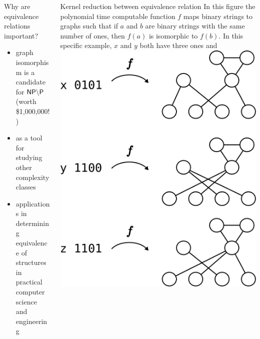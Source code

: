 \documentclass[final]{beamer}
\begin{document}
\begin{frame}{}
\begin{columns}[t]
\begin{column}{.3\linewidth}
      \begin{block}{\LARGE Why are equivalence relations important?}
        \begin{itemize}
          \Large
        \item graph isomorphism is a candidate for ${\mathsf{NP}}\backslash{\ensuremath{\mathsf{P}}}$ (worth
          \$1,000,000!)
        \item as a tool for studying other complexity classes
        \item applications in determining equivalence of structures in
          practical computer science and engineering
        \end{itemize}
      \end{block}
    \end{column}

    \begin{column}{.3\linewidth}
      \begin{block}{\LARGE Kernel reduction between equivalence relation}
        \Large In this figure the polynomial time computable function $f$ maps
        binary strings to graphs such that if $a$ and $b$ are binary strings
        with the same number of ones, then $f(a)$ is isomorphic to $f(b)$. In
        this specific example, $x$ and $y$ both have three ones and 
        \includegraphics{images/rbc_gi}
      \end{block}
    \end{column}


\end{columns}
\end{frame}
\end{document}
